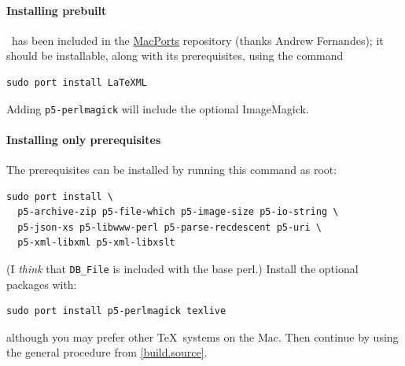 \documentclass{article}
\begin{document}
\paragraph{Installing prebuilt}
\LaTeXML\ has been included in the \href{http://www.macports.org}{MacPorts}
repository (thanks Andrew Fernandes);
it should be installable, along with its prerequisites, using the command
\begin{lstlisting}[style=shell]
sudo port install LaTeXML
\end{lstlisting}
Adding \texttt{p5-perlmagick} will include the optional ImageMagick.


\paragraph{Installing only prerequisites}
The prerequisites can be installed by running this command as root: 
\begin{lstlisting}[style=shell]
sudo port install \
  p5-archive-zip p5-file-which p5-image-size p5-io-string \
  p5-json-xs p5-libwww-perl p5-parse-recdescent p5-uri \
  p5-xml-libxml p5-xml-libxslt
\end{lstlisting}
(I \emph{think} that \verb|DB_File| is included with the base perl.)
Install the optional packages with:
\begin{lstlisting}[style=shell]
sudo port install p5-perlmagick texlive
\end{lstlisting}
although you may prefer other \TeX\ systems on the Mac.
Then continue by using the general procedure from \ref{build.source}.

\end{document}
